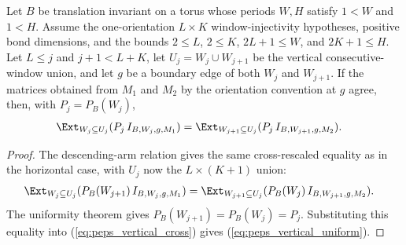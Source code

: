 \begin{lemma}%
    \label{thm:peps_vertical_staircase_consecutive_window_bond_transport_uniform}
    \leanok
    Let $B$ be translation invariant on a torus whose periods $W,H$ satisfy
    $1<W$ and $1<H$. Assume the one-orientation $L\times K$
    window-injectivity hypotheses,
    positive bond dimensions, and the bounds
    $2\le L$, $2\le K$, $2L+1\le W$, and $2K+1\le H$.
    Let $L\le j$ and $j+1<L+K$, let $U_j=W_j\cup W_{j+1}$ be the vertical
    consecutive-window union, and let $g$ be a boundary edge of both $W_j$ and
    $W_{j+1}$. If the matrices obtained from $M_1$ and $M_2$ by the
    orientation convention at $g$ agree, then, with $P_j=P_B(W_j)$,
    \begin{align}
        \Ext_{W_j\subseteq U_j}
        (P_j\,I_{B,W_j,g,M_1})
         & =
        \Ext_{W_{j+1}\subseteq U_j}
        (P_j\,I_{B,W_{j+1},g,M_2}).
        \label{eq:peps_vertical_uniform}
    \end{align}
\end{lemma}
\begin{proof}
    \leanok
    The descending-arm relation gives the same cross-rescaled equality as in
    the horizontal case, with $U_j$ now the $L\times(K+1)$ union:
    \begin{align}
        \Ext_{W_j\subseteq U_j}
        (P_B(W_{j+1})\,I_{B,W_j,g,M_1})
         & =
        \Ext_{W_{j+1}\subseteq U_j}
        (P_B(W_j)\,I_{B,W_{j+1},g,M_2}).
        \label{eq:peps_vertical_cross}
    \end{align}
    The uniformity theorem gives $P_B(W_{j+1})=P_B(W_j)=P_j$.
    Substituting this equality into (\ref{eq:peps_vertical_cross})
    gives (\ref{eq:peps_vertical_uniform}).
\end{proof}
